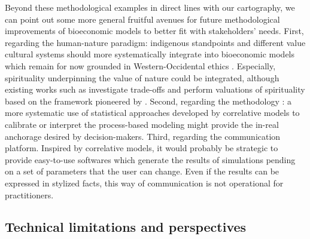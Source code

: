 Beyond these methodological examples in direct lines with our cartography, we can point out some more general fruitful avenues for future methodological improvements of bioeconomic models to better fit with stakeholders' needs. First, regarding the human-nature paradigm: indigenous standpoints and different value cultural systems should more systematically integrate into bioeconomic models which remain for now grounded in Western-Occidental ethics \citep{Kneese1985}. 
Especially, spirituality underpinning the value of nature could be integrated, although existing works such as \cite{Lopes2020} investigate trade-offs and perform valuations of spirituality based on the framework pioneered by \cite{Krutilla1967}. Second, regarding the methodology : a more systematic use of statistical approaches developed by correlative models to calibrate or interpret the process-based modeling might provide the in-real anchorage desired by decision-makers. Third, regarding the communication platform. Inspired by correlative models, it would probably be strategic to provide easy-to-use softwares which generate the results of simulations pending on a set of parameters that the user can change. Even if the results can be expressed in stylized facts, this way of communication is not operational for practitioners.

\subsection{Technical limitations and perspectives}

